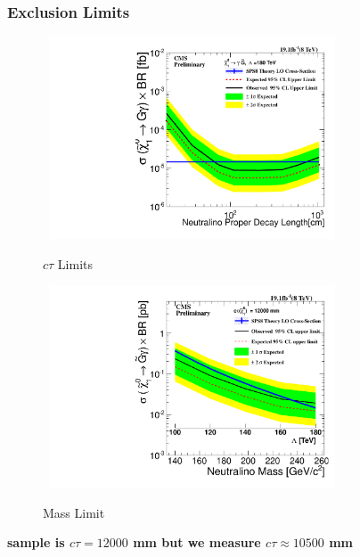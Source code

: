 \documentclass{beamer}
\begin{document}
\begin{frame}
\frametitle{\Huge Exclusion Limits}
\begin{figure}[ht]
\begin{minipage}[b]{0.45\linewidth}
\centering
\mbox{
\includegraphics[height=6cm,width=\textwidth]{THESISPLOTS/180TeV_Neutralino_CrossSecTimesBR_Uplimit.pdf}}
\vspace{-1cm}
\caption{$c\tau$ Limits }
\label{fig:ctaulimit}
\end{minipage}
\hspace{0.1cm}
\begin{minipage}[b]{0.45\linewidth}
\centering
\mbox{
\includegraphics[height=6cm, width=\textwidth]{THESISPLOTS/Neutralino_CrosSecVsMass_Exclusion_limit_12000.pdf}}
\vspace{-1cm}
\caption{Mass Limit }
\label{fig:masslimit}
\end{minipage}
\end{figure}
\vspace{-1cm}
\alert{\textbf{sample is $c\tau= 12000$ mm but we measure $c\tau \approx 10500$ mm}}
\end{frame}
\end{document}

